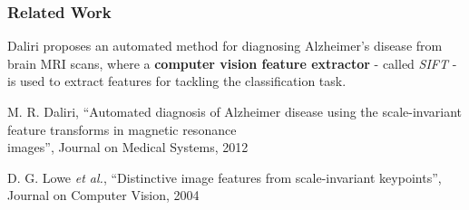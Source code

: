 \begin{frame}
	\frametitle{Related Work}
	
	\Large
	
	\vspace{0.6cm}
	
	Daliri \cite{Daliri12} proposes an automated method for diagnosing Alzheimer's disease from brain
	MRI scans, where a \textbf{computer vision feature extractor} - called \emph{SIFT} \cite{Lowe04} -
	is used to extract features for tackling the classification task.
	
	\begin{center}
	\end{center}
	
	\vspace{0.02cm}
	
	\tiny
	
	\cite{Daliri12} M. R. Daliri, ``Automated diagnosis of Alzheimer disease using the scale-invariant
	feature transforms in magnetic resonance\\ \hspace{0.25cm} images'', Journal on Medical Systems,
	2012
	
	\cite{Lowe04} D. G. Lowe \emph{et al.}, ``Distinctive image features from scale-invariant
	keypoints'', Journal on Computer Vision, 2004
\end{frame}
